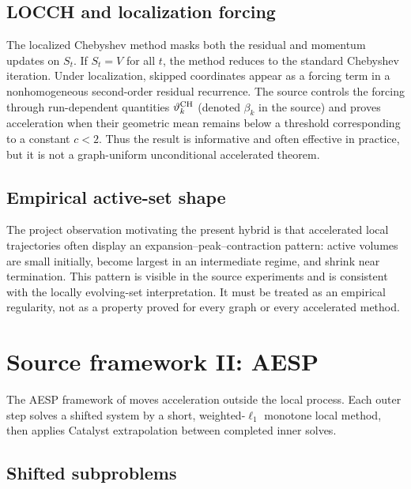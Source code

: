 \subsection{LOCCH and localization forcing}

The localized Chebyshev method masks both the residual and momentum updates on
$S_t$.  If $S_t=V$ for all $t$, the method reduces to the standard Chebyshev
iteration.  Under localization, skipped coordinates appear as a forcing term
in a nonhomogeneous second-order residual recurrence.  The source controls the
forcing through run-dependent quantities $\vartheta_k^{\rm CH}$ (denoted
$\beta_k$ in the source) and proves acceleration
when their geometric mean remains below a threshold corresponding to a
constant $c<2$.  Thus the result is informative and often effective in
practice, but it is not a graph-uniform unconditional accelerated theorem.

\subsection{Empirical active-set shape}

The project observation motivating the present hybrid is that accelerated
local trajectories often display an expansion--peak--contraction pattern:
active volumes are small initially, become largest in an intermediate regime,
and shrink near termination.  This pattern is visible in the source
experiments and is consistent with the locally evolving-set interpretation.
It must be treated as an empirical regularity, not as a property proved for
every graph or every accelerated method.

\section{Source framework II: AESP}
\label{sec:work2}

The AESP framework of \citet{huang2025accelerated} moves acceleration outside
the local process.  Each outer step solves a shifted system by a short,
weighted-$\ell_1$ monotone local method, then applies Catalyst extrapolation
between completed inner solves.

\subsection{Shifted subproblems}

